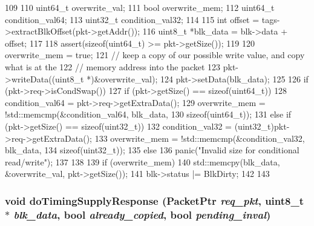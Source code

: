 \begin{DoxyCode}
109 {
110     uint64_t overwrite_val;
111     bool overwrite_mem;
112     uint64_t condition_val64;
113     uint32_t condition_val32;
114 
115     int offset = tags->extractBlkOffset(pkt->getAddr());
116     uint8_t *blk_data = blk->data + offset;
117 
118     assert(sizeof(uint64_t) >= pkt->getSize());
119 
120     overwrite_mem = true;
121     // keep a copy of our possible write value, and copy what is at the
122     // memory address into the packet
123     pkt->writeData((uint8_t *)&overwrite_val);
124     pkt->setData(blk_data);
125 
126     if (pkt->req->isCondSwap()) {
127         if (pkt->getSize() == sizeof(uint64_t)) {
128             condition_val64 = pkt->req->getExtraData();
129             overwrite_mem = !std::memcmp(&condition_val64, blk_data,
130                                          sizeof(uint64_t));
131         } else if (pkt->getSize() == sizeof(uint32_t)) {
132             condition_val32 = (uint32_t)pkt->req->getExtraData();
133             overwrite_mem = !std::memcmp(&condition_val32, blk_data,
134                                          sizeof(uint32_t));
135         } else
136             panic("Invalid size for conditional read/write\n");
137     }
138 
139     if (overwrite_mem) {
140         std::memcpy(blk_data, &overwrite_val, pkt->getSize());
141         blk->status |= BlkDirty;
142     }
143 }
\end{DoxyCode}
\hypertarget{classCache_a87256886a1eea4638abe1b437f4fe226}{
\subsubsection[{doTimingSupplyResponse}]{\setlength{\rightskip}{0pt plus 5cm}void doTimingSupplyResponse ({\bf PacketPtr} {\em req\_\-pkt}, \/  uint8\_\-t $\ast$ {\em blk\_\-data}, \/  bool {\em already\_\-copied}, \/  bool {\em pending\_\-inval})}}
\label{classCache_a87256886a1eea4638abe1b437f4fe226}



